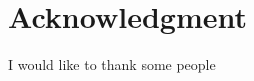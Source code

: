 \documentclass[thesis.tex]{subfiles}
\begin{document}
\chapter*{Acknowledgment}
I would like to thank some people


\blankpage
\end{document}
